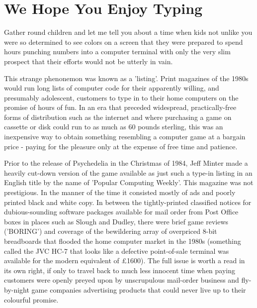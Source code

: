 \chapter{We Hope You Enjoy Typing} 
\lstset{style=6502Style}
Gather round children and let me tell you about a time when kids not unlike you were
so determined to see colors on a screen that they were prepared to spend hours punching
numbers into a computer terminal with only the very slim prospect that their efforts would not be utterly 
in vain.

This strange phenonemon was known as a 'listing'. Print magazines of the 1980s would run long lists of 
computer code for their apparently willing, and presumably adolescent, customers to type in to their home computers on the promise of
hours of fun. In an era that preceded widespread, practically-free forms of distribution such as the internet and
where purchasing a game on cassette or disk could run to as much as 60 pounds sterling,
this was an inexpensive way to obtain something resembling a computer game at a bargain price - paying for the pleasure
only at the expense of free time and patience.  

Prior to the release of Psychedelia in the Christmas of 1984, Jeff Minter made a heavily cut-down version of the
game available as just such a type-in listing in an English title by the name of 'Popular Computing Weekly'. 
This magazine was not prestigious. In the manner of the time it consisted mostly of ads and poorly printed black
and white copy. In between the tightly-printed classified notices for dubious-sounding software packages available 
for mail order from Post Office boxes in places such as Slough and Dudley, there were brief game reviews ('BORING')
and coverage of the bewildering array of overpriced 8-bit breadboards that flooded the home computer market in the 1980s (something
called the JVC HC-7 that looks like a defective point-of-sale terminal was available for the modern equivalent of £1600). The full issue
is worth a read in its own right, if only to travel back to much less innocent time when paying customers were openly preyed upon
by unscrupulous mail-order business and fly-by-night game companies advertising products that could never live up to their colourful
promise.

